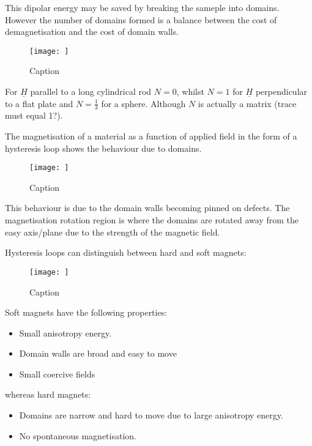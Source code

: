 \noindent This dipolar energy may be saved by breaking the sameple into domains. However the number of domains formed is a balance between the cost of demagnetisation and the cost of domain walls.

\begin{figure}
    \centering
    \texttt{[image: ]}
    \caption{Caption}
    \label{fig:enter-label}
\end{figure}

\noindent For $\underline{H}$ parallel to a long cylindrical rod $N = 0$, whilst $N = 1$ for $\underline{H}$ perpendicular to a flat plate and $N = \frac{1}{3}$ for a sphere. Although $N$ is actually a matrix (trace must equal 1?).

\noindent The magnetisation of a material as a function of applied field in the form of a hysteresis loop shows the behaviour due to domains.

\begin{figure}
    \centering
    \texttt{[image: ]}
    \caption{Caption}
    \label{fig:enter-label}
\end{figure}

\noindent This behaviour is due to the domain walls becoming pinned on defects. The magnetisation rotation region is where the domains are rotated away from the easy axis/plane due to the strength of the magnetic field.

\noindent Hysteresis loops can distinguish between hard and soft magnets:

\begin{figure}
    \centering
    \texttt{[image: ]}
    \caption{Caption}
    \label{fig:enter-label}
\end{figure}

\noindent Soft magnets have the following properties:

\begin{itemize}
    \item Small anisotropy energy.
    \item Domain walls are broad and easy to move
    \item Small coercive fields
\end{itemize}

\noindent whereas hard magnets:

\begin{itemize}
    \item Domains are narrow and hard to move due to large anisotropy energy.
    \item No spontaneous magnetisation.
\end{itemize}

